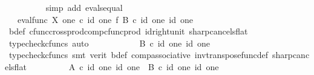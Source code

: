\begin{isabellebody}
\ \ \ \ \ \ \ \ \isamarkupfalse%
\ {\isacharparenleft}{\kern0pt}simp\ add{\isacharcolon}{\kern0pt}\ evals{\isacharunderscore}{\kern0pt}equal{\isacharparenright}{\kern0pt}\isanewline
\ \ \ \ \ \ \isamarkupfalse%
\ \isamarkupfalse%
\ {\isachardoublequoteopen}{\isachardot}{\kern0pt}{\isachardot}{\kern0pt}{\isachardot}{\kern0pt}\ {\isacharequal}{\kern0pt}\ {\isacharparenleft}{\kern0pt}eval{\isacharunderscore}{\kern0pt}func\ X\ one{\isacharparenright}{\kern0pt}\ {\isasymcirc}\isactrlsub c\ {\isacharparenleft}{\kern0pt}id\ one\ {\isasymtimes}\isactrlsub f\ {\isacharparenleft}{\kern0pt}B\isactrlsup {\isasymflat}{\isacharparenright}{\kern0pt}\isactrlsup {\isasymsharp}{\isacharparenright}{\kern0pt}\ {\isasymcirc}\isactrlsub c\ {\isasymlangle}id\ one{\isacharcomma}{\kern0pt}\ id\ one{\isasymrangle}{\isachardoublequoteclose}\isanewline
\ \ \ \ \ \ \ \ \isamarkupfalse%
\ b{\isacharunderscore}{\kern0pt}def\ cfunc{\isacharunderscore}{\kern0pt}cross{\isacharunderscore}{\kern0pt}prod{\isacharunderscore}{\kern0pt}comp{\isacharunderscore}{\kern0pt}cfunc{\isacharunderscore}{\kern0pt}prod\ id{\isacharunderscore}{\kern0pt}right{\isacharunderscore}{\kern0pt}unit{}\ sharp{\isacharunderscore}{\kern0pt}cancels{\isacharunderscore}{\kern0pt}flat\ \isamarkupfalse%
\ {\isacharparenleft}{\kern0pt}typecheck{\isacharunderscore}{\kern0pt}cfuncs{\isacharcomma}{\kern0pt}\ auto{\isacharparenright}{\kern0pt}\isanewline
\ \ \ \ \ \ \isamarkupfalse%
\ \isamarkupfalse%
\ {\isachardoublequoteopen}{\isachardot}{\kern0pt}{\isachardot}{\kern0pt}{\isachardot}{\kern0pt}\ {\isacharequal}{\kern0pt}\ B\isactrlsup {\isasymflat}\ {\isasymcirc}\isactrlsub c\ {\isasymlangle}id\ one{\isacharcomma}{\kern0pt}\ id\ one{\isasymrangle}{\isachardoublequoteclose}\isanewline
\ \ \ \ \ \ \ \ \isamarkupfalse%
\ {\isacharparenleft}{\kern0pt}typecheck{\isacharunderscore}{\kern0pt}cfuncs{\isacharcomma}{\kern0pt}\ smt\ {\isacharparenleft}{\kern0pt}verit{\isacharparenright}{\kern0pt}\ b{\isacharunderscore}{\kern0pt}def\ comp{\isacharunderscore}{\kern0pt}associative{}\ inv{\isacharunderscore}{\kern0pt}transpose{\isacharunderscore}{\kern0pt}func{\isacharunderscore}{\kern0pt}def{}\ sharp{\isacharunderscore}{\kern0pt}cancels{\isacharunderscore}{\kern0pt}flat{\isacharparenright}{\kern0pt}\isanewline
\ \ \ \ \ \ \isamarkupfalse%
\ \isamarkupfalse%
\ {\isachardoublequoteopen}A\isactrlsup {\isasymflat}\ {\isasymcirc}\isactrlsub c\ {\isasymlangle}id\ one{\isacharcomma}{\kern0pt}\ id\ one{\isasymrangle}\ {\isacharequal}{\kern0pt}\ B\isactrlsup {\isasymflat}\ {\isasymcirc}\isactrlsub c\ {\isasymlangle}id\ one{\isacharcomma}{\kern0pt}\ id\ one{\isasymrangle}{\isachardoublequoteclose}\isanewline

\end{isabellebody}

